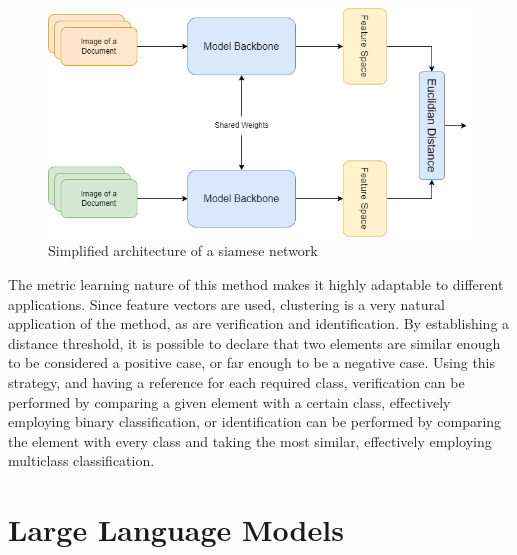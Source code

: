 \begin{figure}[htbp]
\centering
\includegraphics[width=0.9\linewidth]{images/siamese.png}
\caption{Simplified architecture of a siamese network}
\label{fig:siamese}
\end{figure}

The metric learning nature of this method makes it highly adaptable to different applications. Since feature vectors are used, clustering is a very natural application of the method, as are verification and identification. By establishing a distance threshold, it is possible to declare that two elements are similar enough to be considered a positive case, or far enough to be a negative case. Using this strategy, and having a reference for each required class, verification can be performed by comparing a given element with a certain class, effectively employing binary classification, or identification can be performed by comparing the element with every class and taking the most similar, effectively employing multiclass classification.



\section{Large Language Models}

